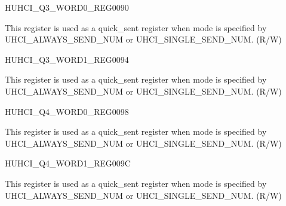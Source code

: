 \begin{register}{H}{UHCI\_Q3\_WORD0\_REG}{\hexprefix{}0090}\label{regdesc:UHCIQ3WORD0REG}
%
\regnewline%
\begin{regdesc}\begin{reglist}
\label{fielddesc:UHCISENDQ3WORD0}\item [UHCI\_SEND\_Q3\_WORD0] This register is used as a quick\_sent register when mode is specified by UHCI\_ALWAYS\_SEND\_NUM or UHCI\_SINGLE\_SEND\_NUM. (R/W)
\end{reglist}\end{regdesc}
\end{register}


\begin{register}{H}{UHCI\_Q3\_WORD1\_REG}{\hexprefix{}0094}\label{regdesc:UHCIQ3WORD1REG}
%
\regnewline%
\begin{regdesc}\begin{reglist}
\label{fielddesc:UHCISENDQ3WORD1}\item [UHCI\_SEND\_Q3\_WORD1] This register is used as a quick\_sent register when mode is specified by UHCI\_ALWAYS\_SEND\_NUM or UHCI\_SINGLE\_SEND\_NUM. (R/W)
\end{reglist}\end{regdesc}
\end{register}


\begin{register}{H}{UHCI\_Q4\_WORD0\_REG}{\hexprefix{}0098}\label{regdesc:UHCIQ4WORD0REG}
%
\regnewline%
\begin{regdesc}\begin{reglist}
\label{fielddesc:UHCISENDQ4WORD0}\item [UHCI\_SEND\_Q4\_WORD0] This register is used as a quick\_sent register when mode is specified by UHCI\_ALWAYS\_SEND\_NUM or UHCI\_SINGLE\_SEND\_NUM. (R/W)
\end{reglist}\end{regdesc}
\end{register}


\begin{register}{H}{UHCI\_Q4\_WORD1\_REG}{\hexprefix{}009C}\label{regdesc:UHCIQ4WORD1REG}
%
\regnewline%
\begin{regdesc}\begin{reglist}
\label{fielddesc:UHCISENDQ4WORD1}\item [UHCI\_SEND\_Q4\_WORD1] This register is used as a quick\_sent register when mode is specified by UHCI\_ALWAYS\_SEND\_NUM or UHCI\_SINGLE\_SEND\_NUM. (R/W)
\end{reglist}\end{regdesc}
\end{register}


